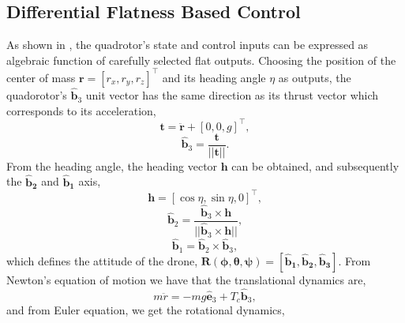\subsection{Differential Flatness Based Control}
As shown in \cite{mellinger_minimum_2011}, the quadrotor's state and control inputs can be expressed as algebraic function of carefully selected flat outputs.
Choosing the position of the center of mass $\mathbf{r} = [r_x, r_y, r_z]^\top$ and its heading angle $\eta$ as outputs, the quadorotor's $\mathbf{\hat{b}}_3$ unit vector has the same direction as its thrust vector which corresponds to its acceleration,
\begin{equation}
    \mathbf{t} = \ddot{\mathbf{r}} + [0, 0, g]^\top,
\end{equation}
\begin{equation}
    \mathbf{\hat{b}}_3 = \frac{\mathbf{t}}{||\mathbf{t}||}.
\end{equation}
From the heading angle, the heading vector $\mathbf{h}$ can be obtained, and subsequently the $\mathbf{\hat{b}_2}$ and $\mathbf{\hat{b}_1}$ axis,
\begin{equation}
    \mathbf{h} = [\cos \eta, \sin \eta, 0]^\top,
\end{equation}
\begin{equation}
    \mathbf{\hat{b}}_2 = \frac{\mathbf{\hat{b}}_3 \times \mathbf{h}}{||\mathbf{\hat{b}}_3 \times \mathbf{h}||},
\end{equation}
\begin{equation}
     \mathbf{\hat{b}}_1 =  \mathbf{\hat{b}}_2  \times  \mathbf{\hat{b}}_3, 
\end{equation}
which defines the attitude of the drone, $\mathbf{R(\phi,\theta,\psi) = [\mathbf{\hat{b}}_1, \mathbf{\hat{b}}_2, \mathbf{\hat{b}}_3]}$. 
From Newton's equation of motion we have that the translational dynamics are,
\begin{equation}\label{trans_dyn}
    m \ddot{r} = -mg \hat{\mathbf{e}}_3 + T_c \hat{\mathbf{b}}_3,
\end{equation}
and from Euler equation, we get the rotational dynamics,

